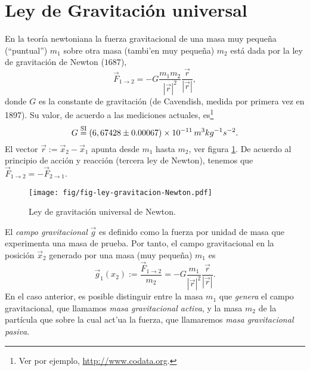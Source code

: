 \section{Ley de Gravitación universal}
En la teoría newtoniana la fuerza gravitacional de una masa muy peque\~na (``puntual'') $m_1$ sobre otra masa (tambi'en muy peque\~na) $m_2$
está dada por la ley de gravitación de Newton ($1687$),
\begin{equation}
\vec{F}_{1\rightarrow 2}=-G\frac{m_1m_2}{|\vec{r}|^2}\frac{\vec{r}}{|\vec{r}|},
\end{equation}
donde $G$ es la constante de gravitación (de Cavendish, medida por primera vez en 1897). Su valor, de acuerdo a las mediciones actuales, es\footnote{Ver por ejemplo, \url{http://www.codata.org}.}
\begin{equation}
G\stackrel{\rm SI}{=}(6,674 28\pm 0.000 67)\times 10^{-11}\, m^3kg^{-1}s^{-2}.
\end{equation}
El vector $\vec{r}:=\vec{x}_2-\vec{x}_1$ apunta desde $m_1$ hasta $m_2$, ver figura \ref{lguN}. De acuerdo al principio de acción y reacción (tercera ley de Newton),
tenemos que $\vec{F}_{1\rightarrow 2}=-\vec{F}_{2\rightarrow 1}$.
\begin{center}
\begin{figure}[H]
\centerline{\texttt{[image: fig/fig-ley-gravitacion-Newton.pdf]}}
\caption{Ley de gravitación universal de Newton.}
\label{lguN}
\end{figure}
\end{center}
El \textit{campo gravitacional} $\vec{g}$ es definido como la fuerza por unidad de masa
que experimenta una masa de prueba. Por tanto, el campo gravitacional en la posición $\vec{x}_2$ generado por una masa (muy peque\~na) $m_1$ es
\begin{equation}
\vec{g}_1(x_2):=\frac{\vec{F}_{1\to 2}}{m_2}=-G\frac{m_1}{|\vec{r}|^2}\frac{\vec{r}}{|\vec{r}|}.
\end{equation}
En el caso anterior, es posible distinguir entre la masa $m_1$ que
\textit{genera} el campo gravitacional, que llamamos \textit{masa gravitacional
activa}, y la masa $m_2$ de la partícula que sobre la cual act'ua la fuerza, que
llamaremos \textit{masa gravitacional pasiva}.

